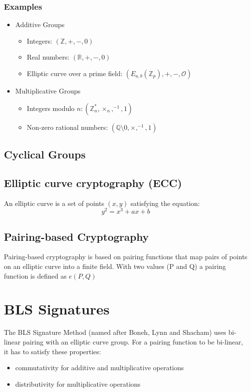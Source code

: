 \documentclass[a4paper,12pt]{scrartcl}
\begin{document}
\subsubsection{Examples}
\begin{itemize}
	\item Additive Groups
	\begin{itemize}
		\item Integers: \( (\mathbb{Z},+,-,0) \)
		\item Real numbers: \( (\mathbb{R},+,-,0) \)
		\item Elliptic curve over a prime field: \( (E_{a,b}(\mathbb{Z}_{p}),+,-, \mathcal{O}) \)
	\end{itemize}
	\item Multiplicative Groups
	\begin{itemize}
		\item Integers modulo \( n: ( \mathbb{Z}_{n}^*, \times_{n}, ^{-1}, 1) \)
		\item Non-zero rational numbers: \( ( \mathbb{Q} \setminus 0, \times, ^{-1}, 1) \)
	\end{itemize}
\end{itemize}

\subsection{Cyclical Groups}

\subsection{Elliptic curve cryptography (ECC)}
An elliptic curve is a set of points \((x,y)\) satisfying the equation\cite[Slide 6.4]{crypto-slides-haenni}:
\begin{equation*}
y^2 = x^3 + ax + b
\end{equation*}

\subsection{Pairing-based Cryptography}
Pairing-based cryptography is based on pairing functions that map pairs of points on an elliptic curve into a finite field.\cite{security-wiki-pbc}
\newline
With two values (P and Q) a pairing function is defined as \( e(P,Q) \)

\pagebreak

\section{BLS Signatures}
The BLS Signature Method (named after Boneh, Lynn and Shacham) uses bi-linear pairing with an elliptic curve group.
\newline
For a pairing function to be bi-linear, it has to satisfy these properties:
\begin{itemize}
	\item commutativity for additive and multiplicative operations
	\item distributivity for multiplicative operations
\end{itemize}
\par
\end{document}
